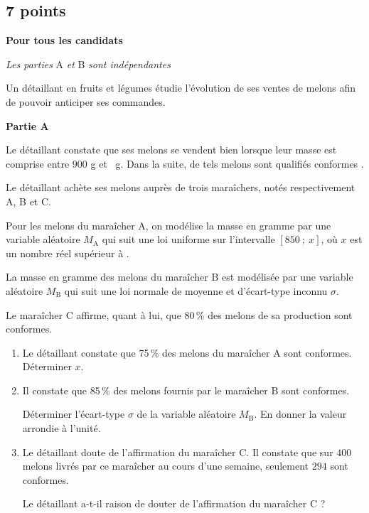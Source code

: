 \documentclass[10pt]{article}
\begin{document}
\subsection{\hfill 7 points}
 
\textbf{Pour tous les candidats}

\medskip

\emph{Les parties} A \emph{et} B \emph{sont indépendantes}

\medskip

Un détaillant en fruits et légumes étudie l'évolution de ses ventes de melons afin de pouvoir
anticiper ses commandes.

\bigskip

\textbf{Partie A}

\medskip

Le détaillant constate que ses melons se vendent bien lorsque leur masse est comprise entre $900$ g et
~g. Dans la suite, de tels melons sont qualifiés \og conformes \fg.

Le détaillant achète ses melons auprès de trois maraîchers, notés respectivement A, B et C.

Pour les melons du maraîcher A, on modélise la masse en gramme par une variable aléatoire $M_{\text{A}}$
qui suit une loi uniforme sur l'intervalle $[850~;~x]$, où $x$ est un nombre réel supérieur à .

La masse en gramme des melons du maraîcher B est modélisée par une variable aléatoire $M_{\text{B}}$ qui
suit une loi normale de moyenne  et d'écart-type inconnu $\sigma$.

Le maraîcher C affirme, quant à lui, que 80\,\% des melons de sa production sont conformes.

\medskip

\begin{enumerate}
\item Le détaillant constate que 75\,\% des melons du maraîcher A sont conformes. Déterminer $x$.
\item Il constate que 85\,\% des melons fournis par le maraîcher B sont conformes.

Déterminer l'écart-type $\sigma$ de la variable aléatoire $M_{\text{B}}$. En donner la valeur arrondie à l'unité.
\item  Le détaillant doute de l'affirmation du maraîcher C. Il constate que sur $400$ melons livrés par ce
maraîcher au cours d'une semaine, seulement $294$ sont conformes.

Le détaillant a-t-il raison de douter de l'affirmation du maraîcher C ?
\end{enumerate}
\end{document}
